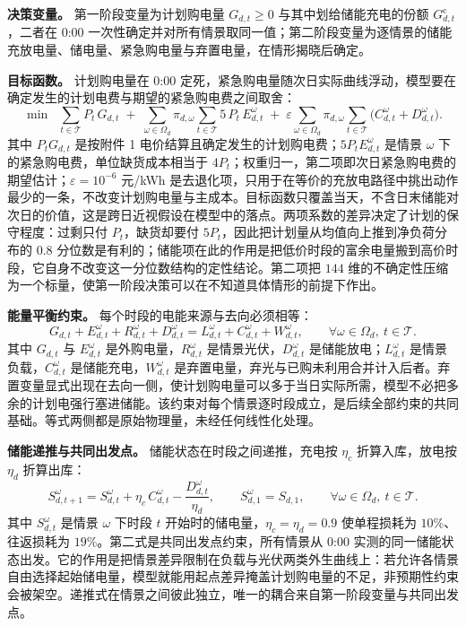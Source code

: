\textbf{决策变量。} 第一阶段变量为计划购电量 $G_{d,t}\ge0$ 与其中划给储能充电的份额 $G^{\mathrm{c}}_{d,t}$，二者在 0:00 一次性确定并对所有情景取同一值；第二阶段变量为逐情景的储能充放电量、储电量、紧急购电量与弃置电量，在情形揭晓后确定。

\textbf{目标函数。} 计划购电量在 0:00 定死，紧急购电量随次日实际曲线浮动，模型要在确定发生的计划电费与期望的紧急购电费之间取舍：
\begin{equation}
\min \;\; \sum_{t \in \mathcal{T}} P_t\, G_{d,t} \;+\; \sum_{\omega \in \Omega_d} \pi_{d,\omega} \sum_{t \in \mathcal{T}} 5\, P_t\, E_{d,t}^{\omega}
\;+\;\varepsilon\sum_{\omega\in\Omega_d}\pi_{d,\omega}\sum_{t\in\mathcal{T}}\bigl(C_{d,t}^{\omega}+D_{d,t}^{\omega}\bigr).\label{eq:obj2}
\end{equation}
其中 $P_tG_{d,t}$ 是按附件 1 电价结算且确定发生的计划购电费；$5P_tE^{\omega}_{d,t}$ 是情景 $\omega$ 下的紧急购电费，单位缺货成本相当于 $4P_t$；权重归一，第二项即次日紧急购电费的期望估计；$\varepsilon=10^{-6}$ 元/kWh 是去退化项，只用于在等价的充放电路径中挑出动作最少的一条，不改变计划购电量与主成本。目标函数只覆盖当天，不含日末储能对次日的价值，这是跨日近视假设在模型中的落点。两项系数的差异决定了计划的保守程度：过剩只付 $P_t$，缺货却要付 $5P_t$，因此把计划量从均值向上推到净负荷分布的 $0.8$ 分位数是有利的；储能项在此的作用是把低价时段的富余电量搬到高价时段，它自身不改变这一分位数结构的定性结论。第二项把 $144$ 维的不确定性压缩为一个标量，使第一阶段决策可以在不知道具体情形的前提下作出。

\textbf{能量平衡约束。} 每个时段的电能来源与去向必须相等：
\begin{equation}
G_{d,t} + E_{d,t}^{\omega} + R_{d,t}^{\omega} + D_{d,t}^{\omega} = L_{d,t}^{\omega} + C_{d,t}^{\omega} + W_{d,t}^{\omega}, \qquad \forall \omega \in \Omega_d,\ t \in \mathcal{T}.\label{eq:balance2}
\end{equation}
其中 $G_{d,t}$ 与 $E^{\omega}_{d,t}$ 是外购电量，$R^{\omega}_{d,t}$ 是情景光伏，$D^{\omega}_{d,t}$ 是储能放电；$L^{\omega}_{d,t}$ 是情景负载，$C^{\omega}_{d,t}$ 是储能充电，$W^{\omega}_{d,t}$ 是弃置电量，弃光与已购未利用合并计入后者。弃置变量显式出现在去向一侧，使计划购电量可以多于当日实际所需，模型不必把多余的计划电强行塞进储能。该约束对每个情景逐时段成立，是后续全部约束的共同基础。等式两侧都是原始物理量，未经任何线性化处理。

\textbf{储能递推与共同出发点。} 储能状态在时段之间递推，充电按 $\eta_c$ 折算入库，放电按 $\eta_d$ 折算出库：
\begin{equation}
S_{d,t+1}^{\omega} = S_{d,t}^{\omega} + \eta_c\, C_{d,t}^{\omega} - \frac{D_{d,t}^{\omega}}{\eta_d}, \qquad
S_{d,1}^{\omega} = S_{d,1}, \qquad \forall \omega \in \Omega_d,\ t \in \mathcal{T}.\label{eq:soc2}
\end{equation}
其中 $S^{\omega}_{d,t}$ 是情景 $\omega$ 下时段 $t$ 开始时的储电量，$\eta_c=\eta_d=0.9$ 使单程损耗为 $10\%$、往返损耗为 $19\%$。第二式是共同出发点约束，所有情景从 0:00 实测的同一储能状态出发。它的作用是把情景差异限制在负载与光伏两类外生曲线上：若允许各情景自由选择起始储电量，模型就能用起点差异掩盖计划购电量的不足，非预期性约束会被架空。递推式在情景之间彼此独立，唯一的耦合来自第一阶段变量与共同出发点。


